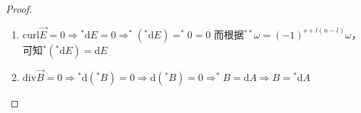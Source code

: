 \begin{enumerate}[（1）]
    \begin{proof}
        \begin{enumerate}[（1）]
            \item $\mathrm{curl}\vec E = 0 \Rightarrow \mathrm{^*d}E = 0  \Rightarrow ^*(\mathrm{^*d}E) = ^*0 = 0$
            而根据$^{**}\omega = (-1)^{s + l(n - l)}\omega$，可知$^*(\mathrm{^*d}E) = \mathrm{d}E$
            \item $\mathrm{div}\vec B = 0 \Rightarrow \mathrm{^*d}(^*B) = 0 \Rightarrow \mathrm{d}(^*B) = 0 \Rightarrow ^*B = \mathrm{d}A \Rightarrow B = \mathrm{^*d}A$
        \end{enumerate}
    \end{proof}
\end{enumerate}
